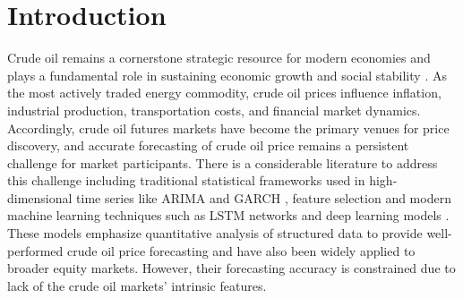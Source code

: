 \documentclass[preprint,12pt,authoryear]{elsarticle}
\begin{document}




\section{Introduction}
\label{SecIntro}

Crude oil remains a cornerstone strategic resource for modern economies and plays a fundamental role in sustaining economic growth and social stability \citep{hamilton1983oil,barsky2002oil, ma_jumps_2020}. As the most actively traded energy commodity, crude oil prices influence inflation, industrial production, transportation costs, and financial market dynamics. 
Accordingly, crude oil futures markets have become the primary venues for price discovery, and accurate forecasting of crude oil price remains a persistent challenge for market participants. There is a considerable literature to address this challenge including traditional statistical frameworks used in high-dimensional time series like ARIMA and GARCH
\citep{xiang2013application,agnolucci2009volatility}, feature selection \citep{zhang_forecasting_2022,song2023forecasting} and modern machine learning techniques such as LSTM networks and deep learning models \citep{zhao2017deep,guo2023forecasting}. These models emphasize quantitative analysis of structured data to provide well-performed crude oil price forecasting and have also been widely applied to broader equity markets. However, their forecasting accuracy is constrained due to lack of the crude oil markets' intrinsic features. 
\end{document}
